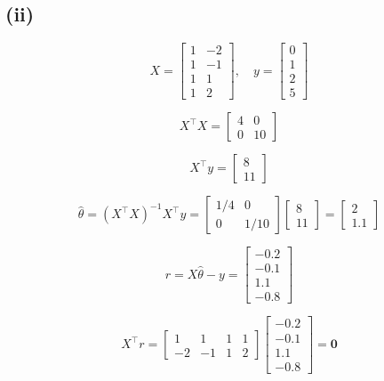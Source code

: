 \documentclass[11pt]{article}
\begin{document}
\subsection*{(ii)}

$$
X = \begin{bmatrix} 1 & -2 \\ 1 & -1 \\ 1 & 1 \\ 1 & 2 \end{bmatrix}, \quad y = \begin{bmatrix} 0 \\ 1 \\ 2 \\ 5 \end{bmatrix}
$$

$$
X^\top X = \begin{bmatrix} 4 & 0 \\ 0 & 10 \end{bmatrix}
$$

$$
X^\top y = \begin{bmatrix} 8 \\ 11 \end{bmatrix}
$$

$$
\hat{\theta} = (X^\top X)^{-1} X^\top y = \begin{bmatrix} 1/4 & 0 \\ 0 & 1/10 \end{bmatrix} \begin{bmatrix} 8 \\ 11 \end{bmatrix} = \begin{bmatrix} 2 \\ 1.1 \end{bmatrix}
$$

$$
r = X\hat{\theta} - y = \begin{bmatrix} -0.2 \\ -0.1 \\ 1.1 \\ -0.8 \end{bmatrix}
$$

$$
X^\top r = \begin{bmatrix} 1 & 1 & 1 & 1 \\ -2 & -1 & 1 & 2 \end{bmatrix} \begin{bmatrix} -0.2 \\ -0.1 \\ 1.1 \\ -0.8 \end{bmatrix} = \mathbf{0}
$$
\end{document}
